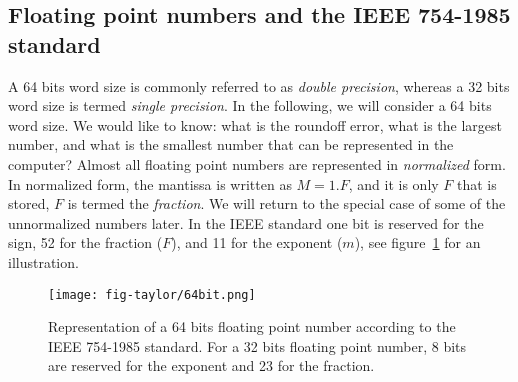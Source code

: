 \documentclass[graybox,sectrefs,envcountresetchap,open=right,final]{svmonodo}
\begin{document}
\subsection{Floating point numbers and the IEEE 754-1985 standard}
A 64 bits word size is commonly referred to as \emph{double precision}, whereas a 32 bits word size is termed \emph{single precision}. In the following, we will consider a 64 bits word size. We would like to know: what is the roundoff error, what is the largest number, and what is the smallest number that can be represented in the computer? Almost all floating point numbers are represented in \emph{normalized} form. In normalized form, the mantissa is written as $M=1.F$, and it is only $F$ that is stored,   $F$ is termed the \emph{fraction}. We will return to the special case of some of the unnormalized numbers later. In the IEEE standard one bit is reserved for the sign, 52 for the fraction ($F$), and 11 for the exponent ($m$), see figure~\ref{fig:taylor:64bit} for an illustration.

\begin{figure}[!ht]  %
  \centerline{\texttt{[image: fig-taylor/64bit.png]}}
  \caption{
  Representation of a 64 bits floating point number according to the IEEE 754-1985 standard. For a 32 bits floating point number, 8 bits are reserved for the exponent and 23 for the fraction. \label{fig:taylor:64bit}
  }
\end{figure}
\end{document}

